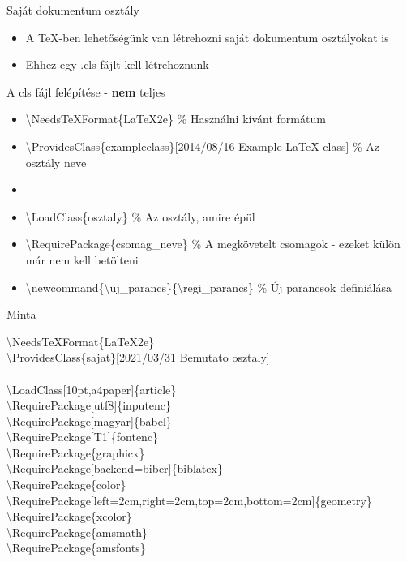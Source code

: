 \documentclass[11pt]{beamer}
\newcommand{\tbs}{\textbackslash}
\begin{document}
\begin{frame}{Saját dokumentum osztály}
\begin{itemize}
\item A TeX-ben lehetőségünk van létrehozni saját dokumentum osztályokat is
\item Ehhez egy .cls fájlt kell létrehoznunk
\end{itemize}
\end{frame}

\begin{frame}{A cls fájl felépítése - \textbf{nem} teljes}
\begin{itemize}
	\item \tbs NeedsTeXFormat\{LaTeX2e\} \% Használni kívánt formátum
	\item \tbs ProvidesClass\{exampleclass\}[2014/08/16 Example LaTeX class] \% Az osztály neve
	\item 
	\item \tbs LoadClass\{osztaly\} \% Az osztály, amire épül
	\item \tbs RequirePackage\{csomag\_neve\} \% A megkövetelt csomagok - ezeket  külön már nem kell betölteni
	\item \tbs newcommand\{\tbs uj\_parancs\}\{\tbs regi\_parancs\} \% Új parancsok definiálása
\end{itemize}
\end{frame}

\begin{frame}{Minta}

\tbs NeedsTeXFormat\{LaTeX2e\} \\
\tbs ProvidesClass\{sajat\}[2021/03/31 Bemutato osztaly] \\
\ \\
\tbs LoadClass[10pt,a4paper]\{article\} \\
\tbs RequirePackage[utf8]\{inputenc\} \\
\tbs RequirePackage[magyar]\{babel\} \\
\tbs RequirePackage[T1]\{fontenc\} \\
\tbs RequirePackage\{graphicx\} \\
\tbs RequirePackage[backend=biber]\{biblatex\} \\
\tbs RequirePackage\{color\} \\
\tbs RequirePackage[left=2cm,right=2cm,top=2cm,bottom=2cm]\{geometry\} \\
\tbs RequirePackage\{xcolor\} \\
\tbs RequirePackage\{amsmath\} \\
\tbs RequirePackage\{amsfonts\} \\
\end{frame}
\end{document}
